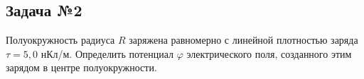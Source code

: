 \subsection{Задача №2}

Полуокружность радиуса $R$ заряжена равномерно с линейной плотностью заряда $\tau=5,0$ нКл/м. Определить потенциал $\varphi$ электрического поля, созданного этим зарядом в центре полуокружности.